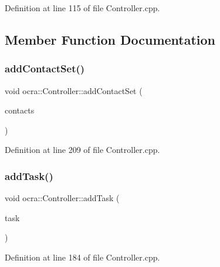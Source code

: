 Definition at line 115 of file Controller.\+cpp.



\subsection{Member Function Documentation}
\hypertarget{classocra_1_1Controller_a51496c52fab832f53fe080a013f13a0e}{}\label{classocra_1_1Controller_a51496c52fab832f53fe080a013f13a0e} 
\subsubsection{\texorpdfstring{add\+Contact\+Set()}{addContactSet()}}
{\footnotesize\ttfamily void ocra\+::\+Controller\+::add\+Contact\+Set (\begin{DoxyParamCaption}\item[{const \hyperlink{classocra_1_1ContactSet}{Contact\+Set} \&}]{contacts }\end{DoxyParamCaption})}



Definition at line 209 of file Controller.\+cpp.

\hypertarget{classocra_1_1Controller_a2135ac360027e8fcca02182055a7f714}{}\label{classocra_1_1Controller_a2135ac360027e8fcca02182055a7f714} 
\subsubsection{\texorpdfstring{add\+Task()}{addTask()}}
{\footnotesize\ttfamily void ocra\+::\+Controller\+::add\+Task (\begin{DoxyParamCaption}\item[{std\+::shared\+\_\+ptr$<$ \hyperlink{classocra_1_1Task}{Task} $>$}]{task }\end{DoxyParamCaption})}



Definition at line 184 of file Controller.\+cpp.

\hypertarget{classocra_1_1Controller_a75755b3a9b346283e4343e15e6f83ddb}{}\label{classocra_1_1Controller_a75755b3a9b346283e4343e15e6f83ddb} 
